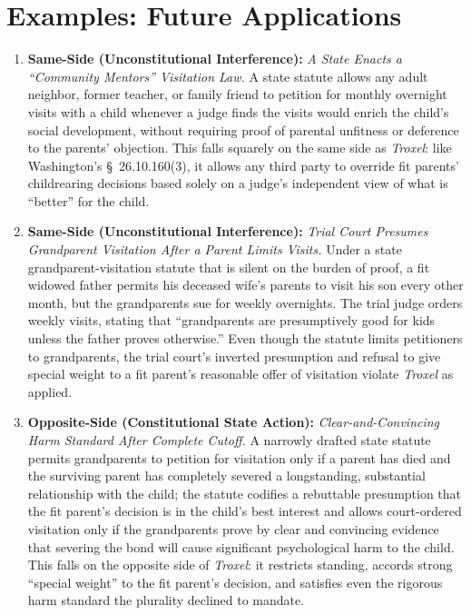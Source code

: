 \documentclass[12pt]{article}
\begin{document}
\section{Examples: Future Applications}
\begin{enumerate}
\item \textbf{Same-Side (Unconstitutional Interference):} \textit{A State Enacts a ``Community Mentors'' Visitation Law.} A state statute allows any adult neighbor, former teacher, or family friend to petition for monthly overnight visits with a child whenever a judge finds the visits would enrich the child's social development, without requiring proof of parental unfitness or deference to the parents' objection. This falls squarely on the same side as \textit{Troxel}: like Washington's \S\ 26.10.160(3), it allows any third party to override fit parents' childrearing decisions based solely on a judge's independent view of what is ``better'' for the child.
\item \textbf{Same-Side (Unconstitutional Interference):} \textit{Trial Court Presumes Grandparent Visitation After a Parent Limits Visits.} Under a state grandparent-visitation statute that is silent on the burden of proof, a fit widowed father permits his deceased wife's parents to visit his son every other month, but the grandparents sue for weekly overnights. The trial judge orders weekly visits, stating that ``grandparents are presumptively good for kids unless the father proves otherwise.'' Even though the statute limits petitioners to grandparents, the trial court's inverted presumption and refusal to give special weight to a fit parent's reasonable offer of visitation violate \textit{Troxel} as applied.
\item \textbf{Opposite-Side (Constitutional State Action):} \textit{Clear-and-Convincing Harm Standard After Complete Cutoff.} A narrowly drafted state statute permits grandparents to petition for visitation only if a parent has died and the surviving parent has completely severed a longstanding, substantial relationship with the child; the statute codifies a rebuttable presumption that the fit parent's decision is in the child's best interest and allows court-ordered visitation only if the grandparents prove by clear and convincing evidence that severing the bond will cause significant psychological harm to the child. This falls on the opposite side of \textit{Troxel}: it restricts standing, accords strong ``special weight'' to the fit parent's decision, and satisfies even the rigorous harm standard the plurality declined to mandate.

\end{enumerate}
\end{document}
